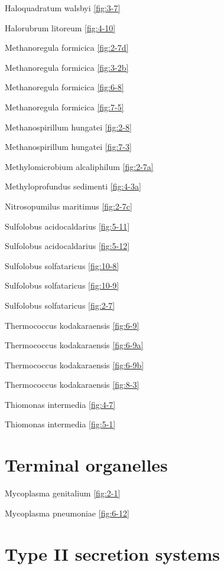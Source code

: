 \documentclass[]{tufte-book}
\begin{document}
Haloquadratum walsbyi \ref{fig:3-7}

Halorubrum litoreum \ref{fig:4-10}

Methanoregula formicica \ref{fig:2-7d}

Methanoregula formicica \ref{fig:3-2b}

Methanoregula formicica \ref{fig:6-8}

Methanoregula formicica \ref{fig:7-5}

Methanospirillum hungatei \ref{fig:2-8}

Methanospirillum hungatei \ref{fig:7-3}

Methylomicrobium alcaliphilum \ref{fig:2-7a}

Methyloprofundus sedimenti \ref{fig:4-3a}

Nitrosopumilus maritimus \ref{fig:2-7c}

Sulfolobus acidocaldarius \ref{fig:5-11}

Sulfolobus acidocaldarius \ref{fig:5-12}

Sulfolobus solfataricus \ref{fig:10-8}

Sulfolobus solfataricus \ref{fig:10-9}

Sulfolobus solfataricus \ref{fig:2-7}

Thermococcus kodakaraensis \ref{fig:6-9}

Thermococcus kodakaraensis \ref{fig:6-9a}

Thermococcus kodakaraensis \ref{fig:6-9b}

Thermococcus kodakaraensis \ref{fig:8-3}

Thiomonas intermedia \ref{fig:4-7}

Thiomonas intermedia \ref{fig:5-1}

\hypertarget{terminal-organelles}{%
\section*{Terminal organelles}\label{terminal-organelles}}

Mycoplasma genitalium \ref{fig:2-1}

Mycoplasma pneumoniae \ref{fig:6-12}

\hypertarget{type-ii-secretion-systems}{%
\section*{Type II secretion systems}\label{type-ii-secretion-systems}}
\end{document}
